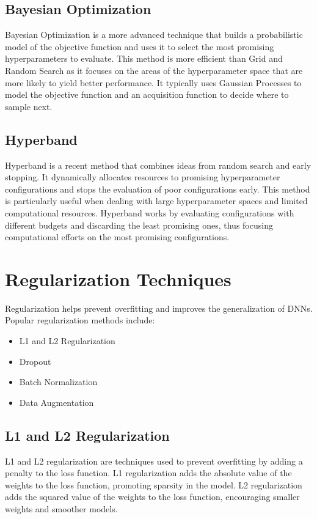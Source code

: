 \documentclass[12pt]{article}
\begin{document}
\subsection{Bayesian Optimization}
Bayesian Optimization is a more advanced technique that builds a probabilistic model of the objective function and uses it to select the most promising hyperparameters to evaluate. This method is more efficient than Grid and Random Search as it focuses on the areas of the hyperparameter space that are more likely to yield better performance. It typically uses Gaussian Processes to model the objective function and an acquisition function to decide where to sample next.

\subsection{Hyperband}
Hyperband is a recent method that combines ideas from random search and early stopping. It dynamically allocates resources to promising hyperparameter configurations and stops the evaluation of poor configurations early. This method is particularly useful when dealing with large hyperparameter spaces and limited computational resources. Hyperband works by evaluating configurations with different budgets and discarding the least promising ones, thus focusing computational efforts on the most promising configurations.

\section{Regularization Techniques}
Regularization helps prevent overfitting and improves the generalization of DNNs. Popular regularization methods include:
\begin{itemize}
    \item L1 and L2 Regularization
    \item Dropout
    \item Batch Normalization
    \item Data Augmentation
\end{itemize}

\subsection{L1 and L2 Regularization}
L1 and L2 regularization are techniques used to prevent overfitting by adding a penalty to the loss function. L1 regularization adds the absolute value of the weights to the loss function, promoting sparsity in the model. L2 regularization adds the squared value of the weights to the loss function, encouraging smaller weights and smoother models.
\end{document}
